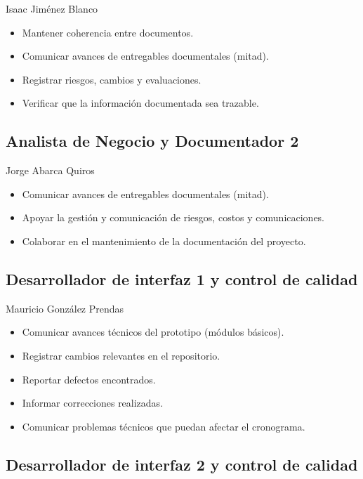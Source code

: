 \documentclass[11pt,spanish]{article}
\begin{document}
Isaac Jiménez Blanco

\begin{itemize}
    \item Mantener coherencia entre documentos.
    \item Comunicar avances de entregables documentales (mitad).
    \item Registrar riesgos, cambios y evaluaciones.
    \item Verificar que la información documentada sea trazable.
\end{itemize}

\subsection{Analista de Negocio y Documentador 2}

Jorge Abarca Quiros

\begin{itemize}
    \item Comunicar avances de entregables documentales (mitad).
    \item Apoyar la gestión y comunicación de riesgos, costos y comunicaciones.
    \item Colaborar en el mantenimiento de la documentación del proyecto.
\end{itemize}

\subsection{Desarrollador de interfaz 1 y control de calidad}

Mauricio González Prendas

\begin{itemize}
    \item Comunicar avances técnicos del prototipo (módulos básicos).
    \item Registrar cambios relevantes en el repositorio.
    \item Reportar defectos encontrados.
    \item Informar correcciones realizadas.
    \item Comunicar problemas técnicos que puedan afectar el cronograma.
\end{itemize}

\subsection{Desarrollador de interfaz 2 y control de calidad}
\end{document}
